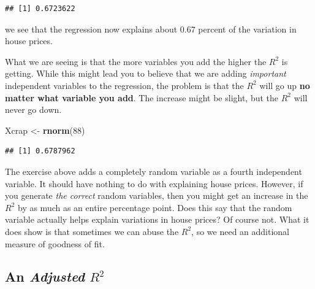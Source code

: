 \documentclass[
]{book}
\newenvironment{Shaded}{\begin{snugshade}}{\end{snugshade}}
\newcommand{\AttributeTok}[1]{\textcolor[rgb]{0.13,0.29,0.53}{#1}}
\newcommand{\DecValTok}[1]{\textcolor[rgb]{0.00,0.00,0.81}{#1}}
\newcommand{\FunctionTok}[1]{\textcolor[rgb]{0.13,0.29,0.53}{\textbf{#1}}}
\newcommand{\NormalTok}[1]{#1}
\newcommand{\OtherTok}[1]{\textcolor[rgb]{0.56,0.35,0.01}{#1}}
\newcommand{\SpecialCharTok}[1]{\textcolor[rgb]{0.81,0.36,0.00}{\textbf{#1}}}
\begin{document}
\begin{verbatim}
## [1] 0.6723622
\end{verbatim}

we see that the regression now explains about 0.67 percent of the variation in house prices.

What we are seeing is that the more variables you add the higher the \(R^2\) is getting. While this might lead you to believe that we are adding \emph{important} independent variables to the regression, the problem is that the \(R^2\) will go up \textbf{no matter what variable you add}. The increase might be slight, but the \(R^2\) will never go down.

\begin{Shaded}
\begin{Highlighting}[]
\NormalTok{Xcrap }\OtherTok{\textless{}{-}} \FunctionTok{rnorm}\NormalTok{(}\DecValTok{88}\NormalTok{)}
\end{Highlighting}
\end{Shaded}

\begin{Shaded}
\end{Shaded}

\begin{verbatim}
## [1] 0.6787962
\end{verbatim}

The exercise above adds a completely random variable as a fourth independent variable. It should have nothing to do with explaining house prices. However, if you generate \emph{the correct} random variables, then you might get an increase in the \(R^2\) by as much as an entire percentage point. Does this say that the random variable actually helps explain variations in house prices? Of course not. What it does show is that sometimes we can abuse the \(R^2\), so we need an additional measure of goodness of fit.

\subsection{\texorpdfstring{An \emph{Adjusted} \(R^2\)}{An Adjusted R\^{}2}}\label{an-adjusted-r2}
\end{document}
